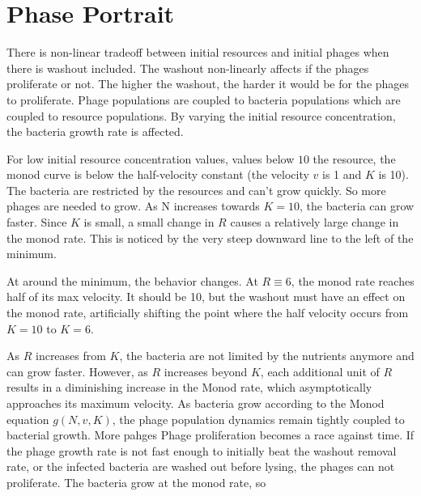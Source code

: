 \section{Phase Portrait}
There is non-linear tradeoff between initial resources and initial phages when there is washout included. 
The washout non-linearly affects if the phages proliferate or not. 
The higher the washout, the harder it would be for the phages to proliferate. 
Phage populations are coupled to bacteria populations which are coupled to resource populations. 
By varying the initial resource concentration, the bacteria growth rate is affected. 

For low initial resource concentration values, values below $10$ the resource, the monod curve is below the half-velocity constant (the velocity $v$ is 1 and $K$ is 10). 
The bacteria are restricted by the resources and can't grow quickly. 
So more phages are needed to grow. 
As N increases towards $K=10$, the bacteria can grow faster. 
Since $K$ is small, a small change in $R$ causes a relatively large change in the monod rate. 
This is noticed by the very steep downward line to the left of the minimum. 

At around the minimum, the behavior changes. 
At $R\equiv 6$, the monod rate reaches half of its max velocity. 
It should be 10, but the washout must have an effect on the monod rate, artificially shifting the point where the half velocity occurs from $K=10$ to $K=6$. 

As $R$ increases from $K$, the bacteria are not limited by the nutrients anymore and can grow faster. 
However, as $R$ increases beyond $K$, each additional unit of $R$ results in a diminishing increase in the Monod rate, which asymptotically approaches its maximum velocity. 
As bacteria grow according to the Monod equation $g(N, v, K)$, the phage population dynamics remain tightly coupled to bacterial growth. 
More pahges
Phage proliferation becomes a race against time. 
If the phage growth rate is not fast enough to initially beat the washout removal rate, or the infected bacteria are washed out before lysing, the phages can not proliferate. 
The bacteria grow at the monod rate, so 